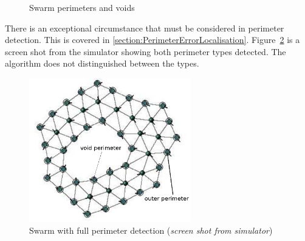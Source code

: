 \begin{figure}[H]
\centering
{}
\caption{Swarm perimeters and voids}
\label{fig:SwarmVoids}
\end{figure}

There is an exceptional circumstance that must be considered in perimeter detection. This is covered in \autoref{section:PerimeterErrorLocalisation}. Figure~\ref{fig:FullPerimeter1} is a screen shot from the simulator showing both perimeter types detected. The algorithm does not distinguished between the types. 

\begin{figure}[H]
\begin{center}
\includegraphics[width=7cm]{CHAPTER-6/figures/FullPerimeter}
\end{center}
\caption[Swarm with full perimeter detection]{Swarm with full perimeter detection (\textit{screen shot from simulator})\label{fig:FullPerimeter1}}
\end{figure}

